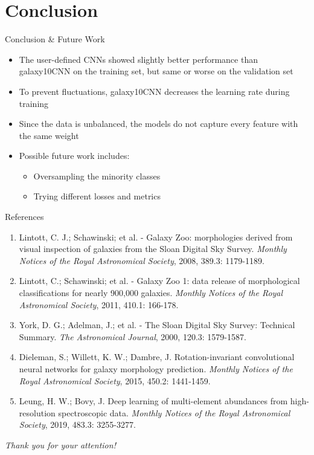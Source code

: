 \documentclass{beamer}
\begin{document}
\section{Conclusion}
\begin{frame}{Conclusion \& Future Work}
    \begin{itemize}
    \setlength\itemsep{1em}
        \item The user-defined CNNs showed slightly better performance than galaxy10CNN on the training set, 
            but same or worse on the validation set
        \item To prevent fluctuations, galaxy10CNN decreases the learning rate during training
        \item Since the data is unbalanced, the models do not capture every feature with the same weight
        \item Possible future work includes:
            \begin{itemize}
                \item Oversampling the minority classes
                \item Trying different losses and metrics
            \end{itemize}
    \end{itemize}
\end{frame}

\begin{frame}[allowframebreaks]{References}
\footnotesize
\begin{enumerate}
\item Lintott, C. J.; Schawinski; et al. - Galaxy Zoo: morphologies derived from visual inspection of galaxies from the Sloan Digital Sky Survey. \textit{Monthly Notices of the Royal Astronomical Society}, 2008, 389.3: 1179-1189.

\item Lintott, C.; Schawinski; et al. - Galaxy Zoo 1: data release of morphological classifications for nearly 900,000 galaxies. \textit{Monthly Notices of the Royal Astronomical Society}, 2011, 410.1: 166-178.

\item York, D. G.; Adelman, J.; et al. - The Sloan Digital Sky Survey: Technical Summary. \textit{The Astronomical Journal}, 2000, 120.3: 1579-1587.

\item Dieleman, S.; Willett, K. W.; Dambre, J. Rotation-invariant convolutional neural networks for galaxy morphology prediction. \textit{Monthly Notices of the Royal Astronomical Society}, 2015, 450.2: 1441-1459.

\item Leung, H. W.; Bovy, J. Deep learning of multi-element abundances from high-resolution spectroscopic data. \textit{Monthly Notices of the Royal Astronomical Society}, 2019, 483.3: 3255-3277.
\end{enumerate}
\end{frame}

\begin{frame}
    \centering \Huge
    \emph{Thank you for your attention!} \\
    \vspace{1cm}
\end{frame}
\end{document}
